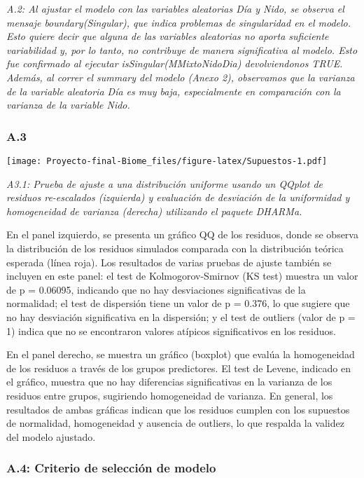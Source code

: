 \documentclass[
  11pt,
]{article}
\begin{document}
\emph{A.2: Al ajustar el modelo con las variables aleatorias Día y Nido,
se observa el mensaje boundary(Singular), que indica problemas de
singularidad en el modelo. Esto quiere decir que alguna de las variables
aleatorias no aporta suficiente variabilidad y, por lo tanto, no
contribuye de manera significativa al modelo. Esto fue confirmado al
ejecutar isSingular(MMixtoNidoDia) devolviendonos TRUE. Además, al
correr el summary del modelo (Anexo 2), observamos que la varianza de la
variable aleatoria Día es muy baja, especialmente en comparación con la
varianza de la variable Nido.}

\subsubsection{A.3}\label{a.3}

\texttt{[image: Proyecto-final-Biome\_files/figure-latex/Supuestos-1.pdf]}

\emph{A3.1: Prueba de ajuste a una distribución uniforme usando un
QQplot de residuos re-escalados (izquierda) y evaluación de desviación
de la uniformidad y homogeneidad de varianza (derecha) utilizando el
paquete DHARMa.}

En el panel izquierdo, se presenta un gráfico QQ de los residuos, donde
se observa la distribución de los residuos simulados comparada con la
distribución teórica esperada (línea roja). Los resultados de varias
pruebas de ajuste también se incluyen en este panel: el test de
Kolmogorov-Smirnov (KS test) muestra un valor de p = 0.06095, indicando
que no hay desviaciones significativas de la normalidad; el test de
dispersión tiene un valor de p = 0.376, lo que sugiere que no hay
desviación significativa en la dispersión; y el test de outliers (valor
de p = 1) indica que no se encontraron valores atípicos significativos
en los residuos.

En el panel derecho, se muestra un gráfico (boxplot) que evalúa la
homogeneidad de los residuos a través de los grupos predictores. El test
de Levene, indicado en el gráfico, muestra que no hay diferencias
significativas en la varianza de los residuos entre grupos, sugiriendo
homogeneidad de varianza. En general, los resultados de ambas gráficas
indican que los residuos cumplen con los supuestos de normalidad,
homogeneidad y ausencia de outliers, lo que respalda la validez del
modelo ajustado.

\subsubsection{A.4: Criterio de selección de
modelo}\label{a.4-criterio-de-selecciuxf3n-de-modelo}
\end{document}
